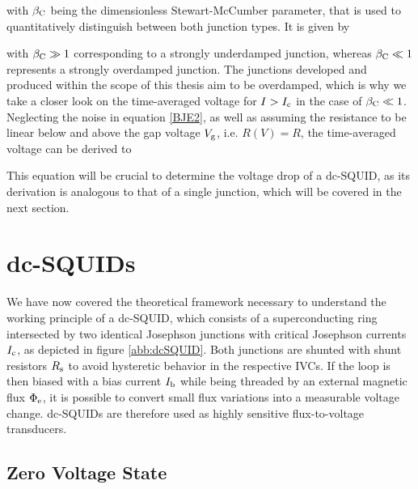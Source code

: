 
with $\beta_{\rm C}$ being the dimensionless Stewart-McCumber parameter, that is used to quantitatively distinguish between both junction types. It is given by 


with $\beta_{\rm C}\gg 1$ corresponding to a strongly underdamped junction, whereas $\beta_{\rm C}\ll 1$ represents a strongly overdamped junction. The junctions developed and produced within the scope of this thesis aim to be overdamped, which is why we take a closer look on the time-averaged voltage for $I>I_{\rm c}$ in the case of $ \beta_{\rm C}\ll 1$. Neglecting the noise in equation \ref{BJE2}, as well as assuming the resistance to be linear below and above the gap voltage $V_{\rm g}$, i.e. $R(V)=R$, the time-averaged voltage can be derived to \cite{Clarke2004}


This equation will be crucial to determine the voltage drop of a dc-SQUID, as its derivation is analogous to that of a single junction, which will be covered in the next section.

\section{dc-SQUIDs}

We have now covered the theoretical framework necessary to understand the working principle of a dc-SQUID, which consists of a superconducting ring intersected by two identical Josephson junctions with critical Josephson currents $I_{\rm c}$, as depicted in figure \ref{abb:dcSQUID}. Both junctions are shunted with shunt resistors $R_{\rm s}$ to avoid hysteretic behavior in the respective IVCs. If the loop is then biased with a bias current $I_{\rm b}$ while being threaded by an external magnetic flux $\Phi_{\rm e}$, it is possible to convert small flux variations into a measurable voltage change. dc-SQUIDs are therefore used as highly sensitive flux-to-voltage transducers.

\subsection{Zero Voltage State}

